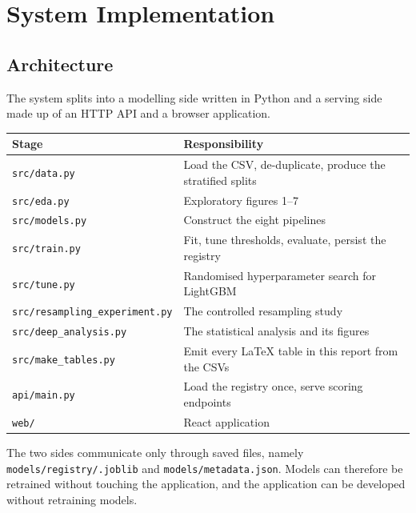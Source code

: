 \section{System Implementation}
\label{sec:system}

\subsection{Architecture}

The system splits into a modelling side written in Python and a serving side made up of an
HTTP API and a browser application.

\begin{center}
\small
\begin{tabularx}{\textwidth}{@{}lY@{}}
\hline
\textbf{Stage} & \textbf{Responsibility} \\
\hline
\texttt{src/data.py}    & Load the CSV, de-duplicate, produce the stratified splits \\
\texttt{src/eda.py}     & Exploratory figures 1--7 \\
\texttt{src/models.py}  & Construct the eight pipelines \\
\texttt{src/train.py}   & Fit, tune thresholds, evaluate, persist the registry \\
\texttt{src/tune.py}    & Randomised hyperparameter search for LightGBM \\
\texttt{src/resampling\_experiment.py} & The controlled resampling study \\
\texttt{src/deep\_analysis.py} & The statistical analysis and its figures \\
\texttt{src/make\_tables.py} & Emit every LaTeX table in this report from the CSVs \\
\hline
\texttt{api/main.py}    & Load the registry once, serve scoring endpoints \\
\texttt{web/}           & React application \\
\hline
\end{tabularx}
\end{center}

The two sides communicate only through saved files, namely
\texttt{models/\allowbreak registry/\allowbreak *.joblib} and \texttt{models/\allowbreak metadata.json}. Models can therefore be
retrained without touching the application, and the application can be developed without
retraining models.


